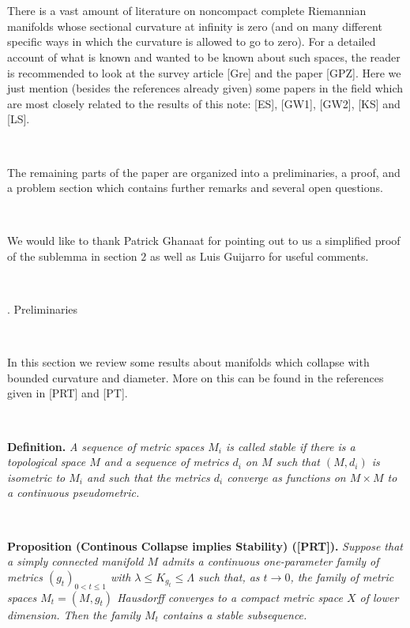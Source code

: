 \

\


There is a vast amount of literature 
on noncompact complete Riemannian manifolds 
whose sectional curvature at infinity is zero
(and on many different specific 
ways in which the curvature is allowed to go to zero).
For a detailed account of what is known and wanted to be known 
about such spaces, the reader is recommended to look at 
the survey article [Gre] and the paper
[GPZ].
Here we just mention
(besides the references already given)
some papers in the field which are most closely related 
to the results of this note: [ES], [GW1], [GW2], [KS] and [LS].

\


The remaining parts of the paper are organized into a preliminaries,
a proof, and a problem section which contains further remarks
and several open questions.



\

We would like to thank Patrick Ghanaat 
for pointing out to us a simplified proof of
the sublemma in section $2$
as well as Luis Guijarro for useful comments.


 
\


. Preliminaries
\endhead 
 
\

In this section we review some results about manifolds which 
collapse with bounded curvature and diameter.
More on this can be found in the references given in [PRT] and [PT].


\


 


\noindent
{\bf Definition.\ts}
{\it
A sequence of metric spaces $M_i$ is called stable if 
there is a topological space $M$ and a sequence of metrics $d_i$ on $M$
such that
$(M,d_i)$ is isometric to $M_i$ and such that the metrics
$d_i$ converge as functions on $M\times M$ 
to a continuous pseudometric.
}

 
\

\noindent
{\bf Proposition (Continous Collapse implies Stability) ([PRT]).\ts} 
{\sl
Suppose that a simply connected manifold $M$  
admits a continuous  
one-parameter family of metrics $(g_t)_{0<t\le 1}$ with 
$\lambda\le
K_{g_t}\le 
\Lambda$ such that, as $t\to 0$, the family of metric spaces $M_t=(M,g_t)$ 
Hausdorff converges to a compact metric space $X$ of lower dimension.  
Then the  
family $M_t$ contains a stable subsequence. 
}


